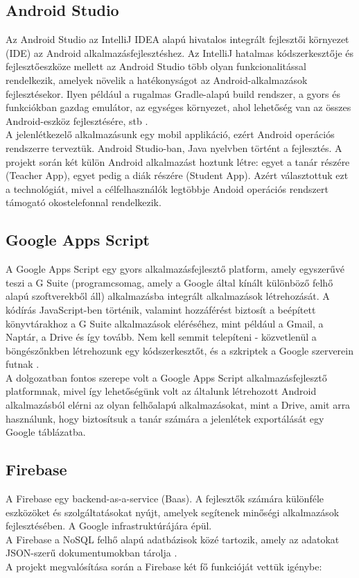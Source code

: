 \documentclass[12pt]{article}
\numberwithin{figure}{section}
\numberwithin{equation}{section}
\begin{document}
\subsection{Android Studio}
Az Android Studio az IntelliJ IDEA alapú hivatalos integrált fejlesztői környezet (IDE) az Android alkalmazásfejlesztéshez. Az IntelliJ hatalmas kódszerkesztője és fejlesztőeszköze mellett az Android Studio több olyan funkcionalitással rendelkezik, amelyek növelik a hatékonyságot az Android-alkalmazások fejlesztésekor. Ilyen például a rugalmas Gradle-alapú build rendszer, a gyors és funkciókban gazdag emulátor, az egységes környezet, ahol lehetőség van az összes Android-eszköz fejlesztésére, stb \cite{9}.\\
A jelenlétkezelő alkalmazásunk egy mobil applikáció, ezért Android operációs rendszerre terveztük. Android Studio-ban, Java nyelvben történt a fejlesztés. A projekt során két külön Android alkalmazást hoztunk létre: egyet a tanár részére (Teacher App), egyet pedig a diák részére (Student App). Azért választottuk ezt a technológiát, mivel a célfelhasználók legtöbbje Andoid operációs rendszert támogató okostelefonnal rendelkezik.

\subsection{Google Apps Script}
A Google Apps Script egy gyors alkalmazásfejlesztő platform, amely egyszerűvé teszi a G Suite (programcsomag, amely a Google által kínált különböző felhő alapú szoftverekből áll) alkalmazásba integrált alkalmazások létrehozását. A kódírás JavaScript-ben történik, valamint hozzáférést biztosít a beépített könyvtárakhoz a G Suite alkalmazások eléréséhez, mint például a Gmail, a Naptár, a Drive és így tovább. Nem kell semmit telepíteni - közvetlenül a böngészőnkben létrehozunk egy kódszerkesztőt, és a szkriptek a Google szerverein futnak \cite{10}.\\
A dolgozatban fontos szerepe volt a Google Apps Script alkalmazásfejlesztő platformnak, mivel így lehetőségünk volt az általunk létrehozott Android alkalmazásból elérni az olyan felhőalapú alkalmazásokat, mint a Drive, amit arra használunk, hogy biztosítsuk a tanár számára a jelenlétek exportálását egy Google táblázatba.

\subsection{Firebase}
A Firebase egy backend-as-a-service (Baas). A fejlesztők számára különféle eszközöket és szolgáltatásokat nyújt, amelyek segítenek minőségi alkalmazások fejlesztésében. A Google infrastruktúrájára épül.\\
A Firebase a NoSQL felhő alapú adatbázisok közé tartozik, amely az adatokat JSON-szerű dokumentumokban tárolja \cite{11}. \\
A projekt megvalósítása során a Firebase két fő funkcióját vettük igénybe:
\end{document}
